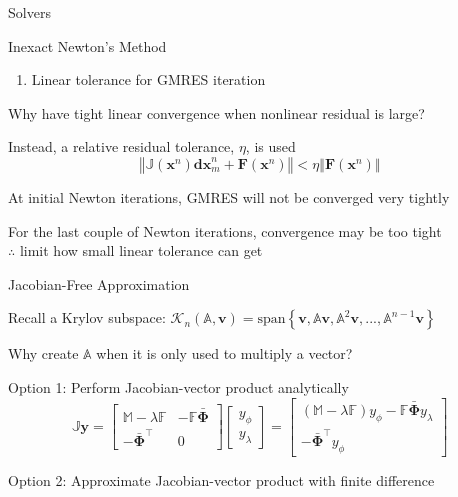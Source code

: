 \documentclass{beamer}
\begin{document}
\begin{section}{Solvers}
\begin{frame}{Inexact Newton's Method}
\begin{customlist}{2ex}{0pt}
\begin{enumerate}
    \item Linear tolerance for GMRES iteration
  \end{enumerate}
  \vfill\item Why have tight linear convergence when nonlinear residual is large?
  \vfill\item Instead, a relative residual tolerance, $\eta$, is used
  \[
   \left\Vert \mathbb{J}\left(\mathbf{x}^{n}\right)\mathbf{dx}_{m}^{n}+\mathbf{F}\left(\mathbf{x}^{n}\right)\right\Vert <\eta\left\Vert \mathbf{F}\left(\mathbf{x}^{n}\right)\right\Vert
  \]
  \vfill\item At initial Newton iterations, GMRES will not be converged very tightly
  \vfill\item For the last couple of Newton iterations, convergence may be too tight \\ $\therefore$ limit how small linear tolerance can get
\end{customlist}
\end{frame}
\begin{frame}{Jacobian-Free Approximation}
\begin{customlist}{2ex}{0pt}
  \item Recall a Krylov subspace: $\mathcal{K}_{n}\left(\mathbb{A},\mathbf{v}\right)=\mathrm{span}\left\{ \mathbf{v},\mathbb{A}\mathbf{v},\mathbb{A}^{2}\mathbf{v},...,\mathbb{A}^{n-1}\mathbf{v}\right\}$
  \vfill\item Why create $\mathbb{A}$ when it is only used to multiply a vector?
  \vfill\item Option 1: Perform Jacobian-vector product analytically
  \[
   \mathbb{J}\mathbf{y}=\left[\begin{array}{cc}
    \mathbb{M}-\lambda\mathbb{F} & -\mathbb{F}\bar{\mathbf{\Phi}}\\
    -\bar{\mathbf{\Phi}}^{\top} & 0
    \end{array}\right]\left[\begin{array}{c}
    y_{\phi}\\
    y_{\lambda}
    \end{array}\right]=\left[\begin{array}{c}
    \left(\mathbb{M}-\lambda\mathbb{F}\right)y_{\phi}-\mathbb{F}\bar{\mathbf{\Phi}}y_{\lambda}\\
    -\bar{\mathbf{\Phi}}^{\top}y_{\phi}
    \end{array}\right]
  \]
  \vfill\item Option 2: Approximate Jacobian-vector product with finite difference

\end{customlist}
\end{frame}
\end{section}
\end{document}
